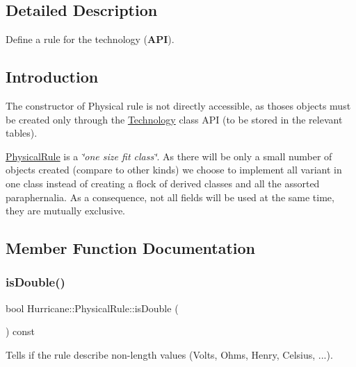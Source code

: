 \subsection{Detailed Description}
Define a rule for the technology ({\bfseries A\+PI}). 

\hypertarget{classHurricane_1_1PhysicalRule_sPhysicalRuleIntro}{}\subsection{Introduction}\label{classHurricane_1_1PhysicalRule_sPhysicalRuleIntro}
The constructor of Physical rule is not directly accessible, as thoses objects must be created only through the \mbox{\hyperlink{classHurricane_1_1Technology}{Technology}} class {\ttfamily A\+PI} (to be stored in the relevant tables).

\mbox{\hyperlink{classHurricane_1_1PhysicalRule}{Physical\+Rule}} is a {\itshape \char`\"{}one size fit class\char`\"{}}. As there will be only a small number of objects created (compare to other kinds) we choose to implement all variant in one class instead of creating a flock of derived classes and all the assorted paraphernalia. As a consequence, not all fields will be used at the same time, they are mutually exclusive. 

\subsection{Member Function Documentation}
\mbox{\label{classHurricane_1_1PhysicalRule_ad419b79177064cab06f7c8dbeccc4dce}} 
\subsubsection{\texorpdfstring{is\+Double()}{isDouble()}}
{\footnotesize\ttfamily bool Hurricane\+::\+Physical\+Rule\+::is\+Double (\begin{DoxyParamCaption}{ }\end{DoxyParamCaption}) const\hspace{0.3cm}{\ttfamily [inline]}}

Tells if the rule describe non-\/length values (Volts, Ohms, Henry, Celsius, ...). \mbox{\label{classHurricane_1_1PhysicalRule_af1e9eeb3499bfd66cedf5756e2d7e2a3}} 
